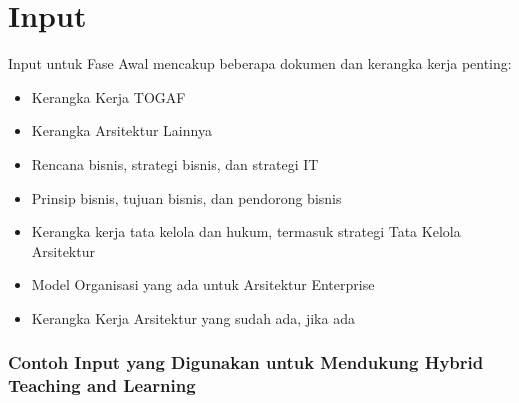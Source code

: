 \section{Input}
Input untuk Fase Awal mencakup beberapa dokumen dan kerangka kerja penting:

\begin{itemize}
	\item Kerangka Kerja TOGAF
	\item Kerangka Arsitektur Lainnya
	\item Rencana bisnis, strategi bisnis, dan strategi IT
	\item Prinsip bisnis, tujuan bisnis, dan pendorong bisnis
	\item Kerangka kerja tata kelola dan hukum, termasuk strategi Tata Kelola Arsitektur
	\item Model Organisasi yang ada untuk Arsitektur Enterprise
	\item Kerangka Kerja Arsitektur yang sudah ada, jika ada
\end{itemize}

\subsubsection{Contoh Input yang Digunakan untuk Mendukung Hybrid Teaching and Learning}

